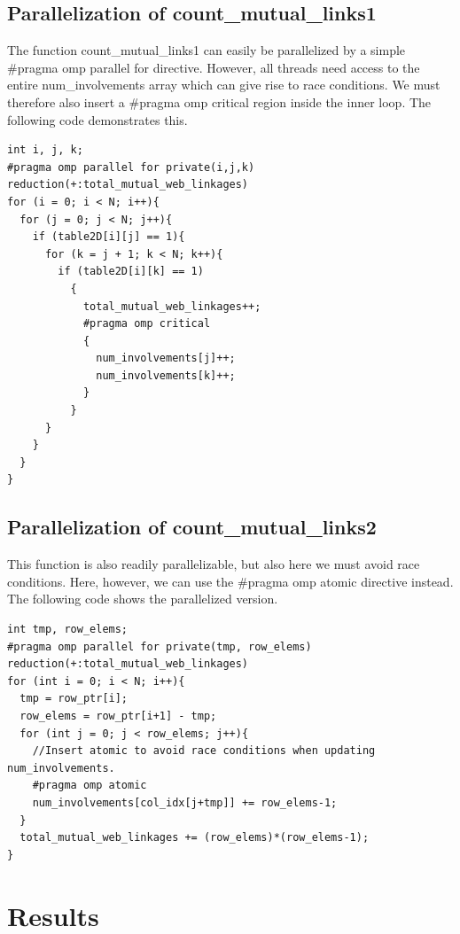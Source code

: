 \documentclass[english,notitlepage, reprint]{revtex4-1}  %
\begin{document}
\subsection*{Parallelization of count\_mutual\_links1}
The function count\_mutual\_links1 can easily be parallelized by a simple \#pragma omp parallel for directive. However, all threads need access to the entire num\_involvements array which can give rise to race conditions. We must therefore also insert a \#pragma omp critical region inside the inner loop. The following code demonstrates this.
\begin{lstlisting}[style=customc]
int i, j, k;
#pragma omp parallel for private(i,j,k) reduction(+:total_mutual_web_linkages)
for (i = 0; i < N; i++){
  for (j = 0; j < N; j++){
    if (table2D[i][j] == 1){
      for (k = j + 1; k < N; k++){
        if (table2D[i][k] == 1)
          {
            total_mutual_web_linkages++;
            #pragma omp critical
            {
              num_involvements[j]++;
              num_involvements[k]++;
            }
          }
      }
    }
  }
}
\end{lstlisting}

\subsection*{Parallelization of count\_mutual\_links2}
This function is also readily parallelizable, but also here we must avoid race conditions. Here, however, we can use the \#pragma omp atomic directive instead. The following code shows the parallelized version.
\begin{lstlisting}[style=customc]
int tmp, row_elems;
#pragma omp parallel for private(tmp, row_elems) reduction(+:total_mutual_web_linkages)
for (int i = 0; i < N; i++){
  tmp = row_ptr[i];
  row_elems = row_ptr[i+1] - tmp;
  for (int j = 0; j < row_elems; j++){
    //Insert atomic to avoid race conditions when updating num_involvements.
    #pragma omp atomic
    num_involvements[col_idx[j+tmp]] += row_elems-1;
  }
  total_mutual_web_linkages += (row_elems)*(row_elems-1);
}
\end{lstlisting}


\section{Results}
\end{document}
